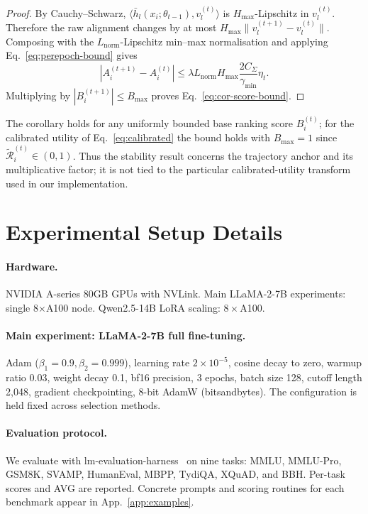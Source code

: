 \begin{proof}
By Cauchy--Schwarz,
$\langle \bar h_l(x_i;\theta_{t-1}),v_l^{(t)}\rangle$ is
$H_{\max}$-Lipschitz in $v_l^{(t)}$. Therefore the raw alignment
changes by at most
$H_{\max}\|v_l^{(t+1)}-v_l^{(t)}\|$. Composing with the
$L_{\mathrm{norm}}$-Lipschitz min--max normalisation and applying
Eq.~\ref{eq:perepoch-bound} gives
\[
|A_i^{(t+1)}-A_i^{(t)}|
\le
\lambda L_{\mathrm{norm}}H_{\max}
\frac{2C_\Sigma}{\gamma_{\min}}\eta_t .
\]
Multiplying by $|B_i^{(t+1)}|\le B_{\max}$ proves
Eq.~\ref{eq:cor-score-bound}.
\end{proof}

The corollary holds for any uniformly bounded base ranking score
$B_i^{(t)}$; for the calibrated utility of Eq.~\ref{eq:calibrated}
the bound holds with $B_{\max}=1$ since
$\tilde{\mathcal{R}}_i^{(t)} \in (0,1)$. Thus the stability result
concerns the trajectory anchor and its multiplicative factor; it is
not tied to the particular calibrated-utility transform used in our
implementation.

\section{Experimental Setup Details}
\label{app:setup-details}

\paragraph{Hardware.}
NVIDIA A-series 80GB GPUs with NVLink. Main LLaMA-2-7B experiments:
single 8$\times$A100 node. Qwen2.5-14B LoRA scaling: $8\times$A100.

\paragraph{Main experiment: LLaMA-2-7B full fine-tuning.}
Adam ($\beta_1=0.9, \beta_2=0.999$), learning rate $2\times10^{-5}$,
cosine decay to zero, warmup ratio 0.03, weight decay 0.1, bf16
precision, 3 epochs, batch size 128, cutoff length 2{,}048,
gradient checkpointing, 8-bit AdamW (bitsandbytes). The
configuration is held fixed across selection methods.

\paragraph{Evaluation protocol.}
We evaluate with lm-evaluation-harness~\cite{eval-harness} on nine
tasks: MMLU, MMLU-Pro, GSM8K, SVAMP, HumanEval, MBPP, TydiQA,
XQuAD, and BBH. Per-task scores and AVG are reported. Concrete
prompts and scoring routines for each benchmark appear in
App.~\ref{app:examples}.

